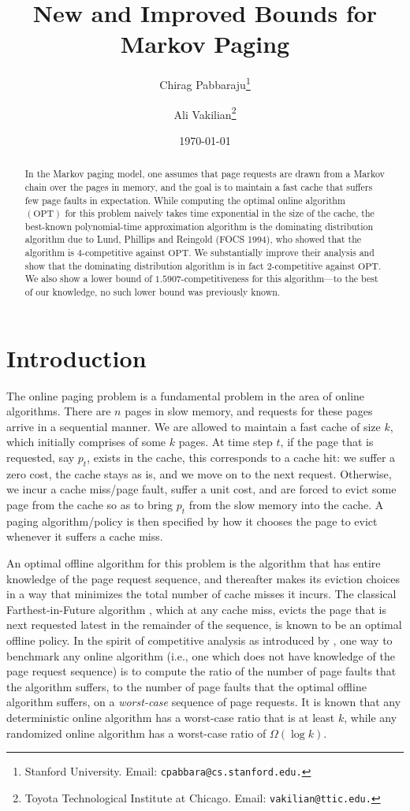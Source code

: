 \documentclass[11pt]{article}
\author{
    Chirag Pabbaraju\thanks{Stanford University. Email: \texttt{cpabbara@cs.stanford.edu.}}
    \and
    Ali Vakilian\thanks{Toyota Technological Institute at Chicago. Email: \texttt{vakilian@ttic.edu.}}
}
\title{New and Improved Bounds for Markov Paging}
\date{\today}
\begin{document}
\maketitle

\begin{abstract}
    In the Markov paging model, one assumes that page requests are drawn from a Markov chain over the pages in memory, and the goal is to maintain a fast cache that suffers few page faults in expectation. While computing the optimal online algorithm $(\mathrm{OPT})$ for this problem naively takes time exponential in the size of the cache, the best-known polynomial-time approximation algorithm is the dominating distribution algorithm due to Lund, Phillips and Reingold (FOCS 1994), who showed that the algorithm is $4$-competitive against $\mathrm{OPT}$. We substantially improve their analysis and show that the dominating distribution algorithm is in fact $2$-competitive against $\mathrm{OPT}$. We also show a lower bound of $1.5907$-competitiveness for this algorithm---to the best of our knowledge, no such lower bound was previously known.
\end{abstract} 
\newpage
\section{Introduction}
\label{sec:intro}


The online paging problem is a fundamental problem in the area of online
algorithms. There are $n$ pages in slow memory, and requests for these pages arrive in a sequential manner. We are allowed to maintain a fast cache of size $k$, which initially comprises of some $k$ pages. At time step $t$, if the page that is requested, say $p_t$, exists in the cache, this corresponds to a cache hit: we suffer a zero cost, the cache stays as is, and we move on to the next request. Otherwise, we incur a cache miss/page fault, suffer a unit cost, and are forced to evict some page from the cache so as to bring $p_t$ from the slow memory into the cache. A paging algorithm/policy is then specified by how it chooses the page to evict whenever it suffers a cache miss.

An optimal offline algorithm for this problem is the algorithm that has entire knowledge of the page request sequence, and thereafter makes its eviction choices in a way that minimizes the total number of cache misses it incurs. The classical Farthest-in-Future algorithm \citep{belady1966study}, which at any cache miss, evicts the page that is next requested latest in the remainder of the sequence, is known to be an optimal offline policy. In the spirit of competitive analysis as introduced by \cite{sleator1985amortized}, one way to benchmark any online algorithm (i.e., one which does not have knowledge of the page request sequence) is to compute the ratio of the number of page faults that the algorithm suffers, to the number of page faults that the optimal offline algorithm suffers, on a \textit{worst-case} sequence of page requests. It is known that any deterministic online algorithm has a worst-case ratio that is at least $k$, while any randomized online algorithm has a worst-case ratio of $\Omega(\log k)$.
\end{document}
